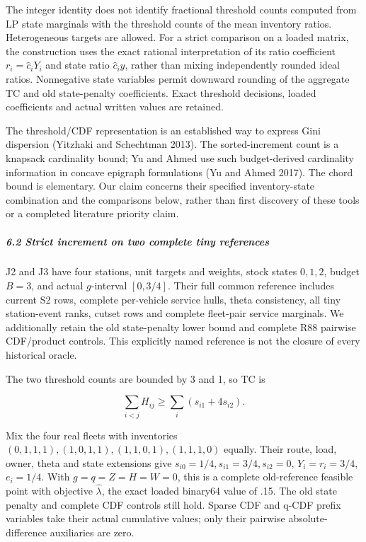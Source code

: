 \documentclass[
  american,
  11pt,
]{article}
\begin{document}
The integer identity does not identify fractional threshold counts
computed from LP state marginals with the threshold counts of the mean
inventory ratios. Heterogeneous targets are allowed. For a strict
comparison on a loaded matrix, the construction uses the exact rational
interpretation of its ratio coefficient \(r_i=\widehat c_iY_i\) and
state ratio \(\widehat c_i y\), rather than mixing independently rounded
ideal ratios. Nonnegative state variables permit downward rounding of
the aggregate TC and old state-penalty coefficients. Exact threshold
decisions, loaded coefficients and actual written values are retained.

The threshold/CDF representation is an established way to express Gini
dispersion (Yitzhaki and Schechtman 2013). The sorted-increment count is
a knapsack cardinality bound; Yu and Ahmed use such budget-derived
cardinality information in concave epigraph formulations (Yu and Ahmed
2017). The chord bound is elementary. Our claim concerns their specified
inventory-state combination and the comparisons below, rather than first
discovery of these tools or a completed literature priority claim.

\subparagraph{6.2 Strict increment on two complete tiny
references}\label{strict-increment-on-two-complete-tiny-references}

J2 and J3 have four stations, unit targets and weights, stock states
\(0,1,2\), budget \(B=3\), and actual \(g\)-interval \([0,3/4]\). Their
full common reference includes current S2 rows, complete per-vehicle
service hulls, theta consistency, all tiny station-event ranks, cutset
rows and complete fleet-pair service marginals. We additionally retain
the old state-penalty lower bound and complete R88 pairwise CDF/product
controls. This explicitly named reference is not the closure of every
historical oracle.

The two threshold counts are bounded by 3 and 1, so TC is

\[
\sum_{i<j}H_{ij}\ge\sum_i(s_{i1}+4s_{i2}).
\]

Mix the four real fleets with inventories
\((0,1,1,1),(1,0,1,1),(1,1,0,1),(1,1,1,0)\) equally. Their route, load,
owner, theta and state extensions give
\(s_{i0}=1/4,s_{i1}=3/4,s_{i2}=0\), \(Y_i=r_i=3/4\), \(e_i=1/4\). With
\(g=q=Z=H=W=0\), this is a complete old-reference feasible point with
objective \(\widehat\lambda\), the exact loaded binary64 value of .15.
The old state penalty and complete CDF controls still hold. Sparse CDF
and q-CDF prefix variables take their actual cumulative values; only
their pairwise absolute-difference auxiliaries are zero.
\end{document}

